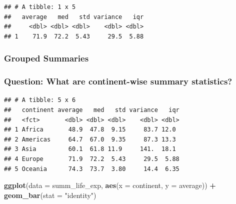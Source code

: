 \documentclass[11pt,]{article}
\newenvironment{Shaded}{\begin{snugshade}}{\end{snugshade}}
\newcommand{\KeywordTok}[1]{\textcolor[rgb]{0.13,0.29,0.53}{\textbf{#1}}}
\newcommand{\DataTypeTok}[1]{\textcolor[rgb]{0.13,0.29,0.53}{#1}}
\newcommand{\StringTok}[1]{\textcolor[rgb]{0.31,0.60,0.02}{#1}}
\newcommand{\OperatorTok}[1]{\textcolor[rgb]{0.81,0.36,0.00}{\textbf{#1}}}
\newcommand{\NormalTok}[1]{#1}
\begin{document}
\begin{verbatim}
## # A tibble: 1 x 5
##   average   med   std variance   iqr
##     <dbl> <dbl> <dbl>    <dbl> <dbl>
## 1    71.9  72.2  5.43     29.5  5.88
\end{verbatim}

\subsubsection{Grouped Summaries}\label{grouped-summaries}

\subsubsection{Question: What are continent-wise summary
statistics?}\label{question-what-are-continent-wise-summary-statistics}

\begin{Shaded}
\end{Shaded}

\begin{verbatim}
## # A tibble: 5 x 6
##   continent average   med   std variance   iqr
##   <fct>       <dbl> <dbl> <dbl>    <dbl> <dbl>
## 1 Africa       48.9  47.8  9.15     83.7 12.0 
## 2 Americas     64.7  67.0  9.35     87.3 13.3 
## 3 Asia         60.1  61.8 11.9     141.  18.1 
## 4 Europe       71.9  72.2  5.43     29.5  5.88
## 5 Oceania      74.3  73.7  3.80     14.4  6.35
\end{verbatim}

\begin{Shaded}
\begin{Highlighting}[]
\KeywordTok{ggplot}\NormalTok{(}\DataTypeTok{data =}\NormalTok{ summ_life_exp, }
       \KeywordTok{aes}\NormalTok{(}\DataTypeTok{x =}\NormalTok{ continent, }\DataTypeTok{y =}\NormalTok{ average)) }\OperatorTok{+}
\StringTok{  }\KeywordTok{geom_bar}\NormalTok{(}\DataTypeTok{stat =} \StringTok{"identity"}\NormalTok{)}
\end{Highlighting}
\end{Shaded}
\end{document}
